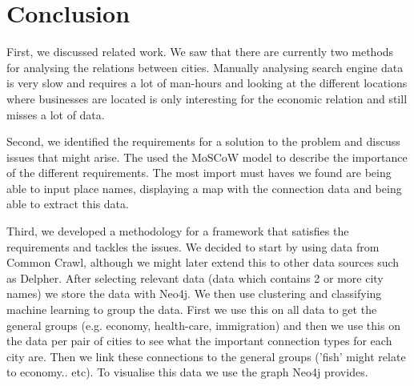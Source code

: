 \chapter{Conclusion}


First, we discussed related work. We saw that there are currently two methods for analysing the relations between cities. Manually analysing search engine data is very slow and requires a lot of man-hours and looking at the different locations where businesses are located is only interesting for the economic relation and still misses a lot of data.


Second, we identified the requirements for a solution to the problem and discuss issues that might arise. The used the MoSCoW model to describe the importance of the different requirements. The most import must haves we found are being able to input place names, displaying a map with the connection data and being able to extract this data.


Third, we developed a methodology for a framework that satisfies the requirements and tackles the issues. We decided to start by using data from Common Crawl, although we might later extend this to other data sources such as Delpher. After selecting relevant data (data which contains 2 or more city names) we store the data with Neo4j. We then use clustering and classifying machine learning to group the data. First we use this on all data to get the general groups (e.g. economy, health-care, immigration) and then we use this on the data per pair of cities to see what the important connection types for each city are. Then we link these connections to the general groups ('fish' might relate to economy.. etc). To visualise this data we use the graph Neo4j provides.

